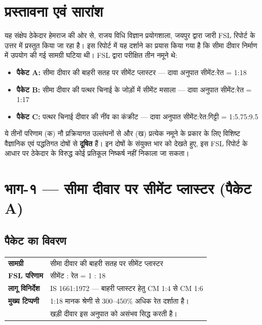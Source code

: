 \documentclass[12pt, a4paper]{article}
\begin{document}
\section{प्रस्तावना एवं सारांश}

यह संक्षेप ठेकेदार हेमराज की ओर से, राजय विधि विज्ञान प्रयोगशाला, जयपुर द्वारा जारी FSL रिपोर्ट के उत्तर में प्रस्तुत किया जा रहा है। इस रिपोर्ट में यह दर्शाने का प्रयास किया गया है कि सीमा दीवार निर्माण में उपयोग की गई सामग्री घटिया थी। FSL द्वारा परीक्षित तीन नमूने थे:

\begin{itemize}
  \item \textbf{पैकेट A:} सीमा दीवार की बाहरी सतह पर सीमेंट प्लास्टर --- दावा अनुपात सीमेंट:रेत = 1:18
  \item \textbf{पैकेट B:} सीमा दीवार की पत्थर चिनाई के जोड़ों में सीमेंट मसाला --- दावा अनुपात सीमेंट:रेत = 1:17
  \item \textbf{पैकेट C:} पत्थर चिनाई दीवार की नींव का कंक्रीट --- दावा अनुपात सीमेंट:रेत:गिट्टी = 1:5.75:9.5
\end{itemize}

ये तीनों परिणाम (क) नौ प्रक्रियागत उल्लंघनों से और (ख) प्रत्येक नमूने के प्रकार के लिए विशिष्ट वैज्ञानिक एवं पद्धतिगत दोषों से \textbf{दूषित} हैं। इन दोषों के संयुक्त भार को देखते हुए, इस FSL रिपोर्ट के आधार पर ठेकेदार के विरुद्ध कोई प्रतिकूल निष्कर्ष नहीं निकाला जा सकता।

\section{भाग-१ --- सीमा दीवार पर सीमेंट प्लास्टर (पैकेट A)}

\subsection{पैकेट का विवरण}

\begin{center}
\begin{tabular}{|l|l|}
  \hline
  \textbf{सामग्री} & सीमा दीवार की बाहरी सतह पर सीमेंट प्लास्टर \\
  \textbf{FSL परिणाम} & सीमेंट : रेत = 1 : 18 \\
  \textbf{लागू विनिर्देश} & IS 1661:1972 --- बाहरी प्लास्टर हेतु CM 1:4 से CM 1:6 \\
  \textbf{मुख्य टिप्पणी} & 1:18 मानक श्रेणी से 300--450\% अधिक रेत दर्शाता है। \\
                         & खड़ी दीवार इस अनुपात को असंभव सिद्ध करती है। \\
  \hline
\end{tabular}
\end{center}
\end{document}

